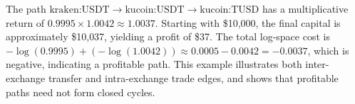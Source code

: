 The path $\text{kraken:USDT} \to \text{kucoin:USDT} \to \text{kucoin:TUSD}$ has a multiplicative return of $0.9995 \times 1.0042 \approx 1.0037$. Starting with \$10{,}000, the final capital is approximately \$10{,}037, yielding a profit of \$37. The total log-space cost is $-\log(0.9995) + (-\log(1.0042)) \approx 0.0005 - 0.0042 = -0.0037$, which is negative, indicating a profitable path. This example illustrates both inter-exchange transfer and intra-exchange trade edges, and shows that profitable paths need not form closed cycles.
